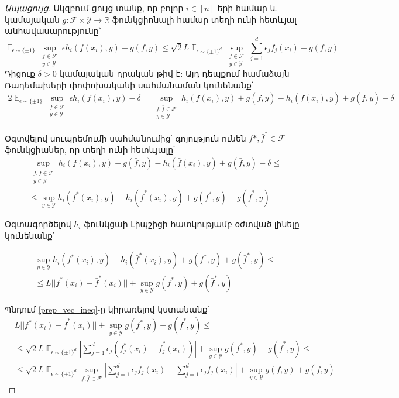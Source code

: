 \documentclass[12pt]{article}
\DeclareMathOperator*{\E}{\mathbb{E}}
\begin{document}
\begin{proof}[Ապացույց]
Սկզբում ցույց տանք, որ բոլոր $i \in [n]$-երի համար և կամայական $g:\mathcal{F}\times \mathcal{Y} \rightarrow \mathbb{R}$  ֆունկցիոնալի համար տեղի ունի հետևյալ անհավասարությունը՝
\begin{equation}
\label{sup_ineq}
\E_{\epsilon \sim \{\pm1\}}\sup_{\substack{f \in \mathcal{F} \\ y \in \mathcal{Y}}}    {\epsilon h_i(f(x_i), y)} + g(f, y)   \leq    \sqrt{2}L 
\E_{\epsilon \sim \{\pm1\}^d}\sup_{\substack{f \in \mathcal{F} \\ y \in \mathcal{Y}}}      {   \sum_{j=1}^d    \epsilon_jf_j(x_i)} + g(f, y)
\end{equation}
Դիցուք $\delta > 0$ կամայական դրական թիվ է։ Այդ դեպքում համաձայն Ռադեմախերի փոփոխականի սահմանաման կունենանք՝
\begin{align*}
 2\E_{\epsilon \sim \{\pm1\}}\sup_{\substack{f \in \mathcal{F} \\ y \in \mathcal{Y}}}    {\epsilon h_i(f(x_i), y)} - \delta  
= \sup_{\substack{f, \bar{f} \in \mathcal{F}  \\ y \in \mathcal{Y}}}    {h_i(f(x_i), y)  + g(\bar{f}, y) - h_i(\bar{f}(x_i), y) + g(\bar{f}, y) - \delta}
\end{align*}

Օգտվելով սուպրեմումի սահմանումից՝ գոյություն ունեն $f*, \bar{f}^* \in \mathcal{F}$ ֆունկցիաներ, որ տեղի ունի հետևյալը՝
\begin{align*}
 &\sup_{\substack{f, \bar{f} \in \mathcal{F}  \\ y \in \mathcal{Y}}}    {h_i(f(x_i), y)  + g(\bar{f}, y) - h_i(\bar{f}(x_i), y) + g(\bar{f}, y) -\delta}  \leq \\
 &\leq \sup_{y \in \mathcal{Y}}   h_i(f^*(x_i), y) - h_i(\bar{f}^*(x_i), y) + g(f^*, y) + g(\bar{f}^*, y)
\end{align*}

Օգտագործելով $h_i$ ֆունկցաի Լիպշիցի հատկությամբ օժտված լինելը կունենանք՝ 

\begin{align*}
 &\sup_{y \in \mathcal{Y}}   h_i(f^*(x_i), y) - h_i(\bar{f}^*(x_i), y) + g(f^*, y) + g(\bar{f}^*, y) \leq \\
& \leq   {L||f^*(x_i) - \bar{f}^*(x_i)||} + \sup_{y \in \mathcal{Y}}  g(f^*, y) + g(\bar{f}^*, y)
\end{align*}

Պնդում \ref{prep_vec_ineq}-ը կիրառելով կստանանք՝
\begin{align*}
 &{L||f^*(x_i) - \bar{f}^*(x_i)||} + \sup_{y \in \mathcal{Y}}  g(f^*, y) + g(\bar{f}^*, y) \leq \\
& \leq  {\sqrt{2}L} \E_{\epsilon \sim \{\pm 1\}^d}    \left |  \sum_{j=1}^d \epsilon_j (f^*_j(x_i) - \bar{f}_j^*(x_i))  \right|                    + \sup_{y \in \mathcal{Y}}    g(f^*, y) + g(\bar{f}^*, y)  \leq \\
&\leq  {\sqrt{2}L} \E_{\epsilon \sim \{\pm 1\}^d}        \sup_{f, \bar{f} \in \mathcal{F}}      \left |  \sum_{j=1}^d \epsilon_j f_j(x_i) - \sum_{j=1}^d \epsilon_j\bar{f}_j(x_i)  \right|                    + \sup_{y \in \mathcal{Y}}    g(f, y) + g(\bar{f}, y) 
\end{align*}


\end{proof}
\end{document}
